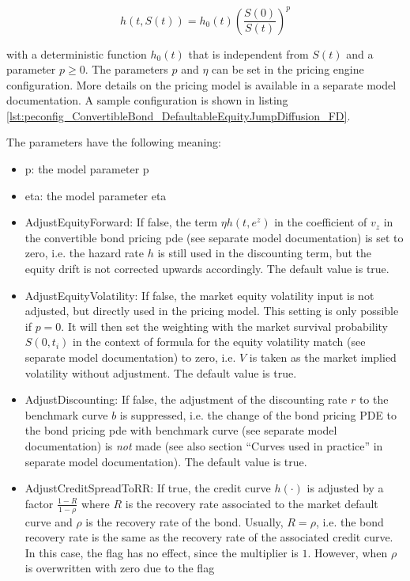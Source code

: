 \begin{equation}
h(t,S(t)) = h_0(t) \left( \frac{S(0)}{S(t)} \right)^p
\end{equation}

with a deterministic function $h_0(t)$ that is independent from $S(t)$ and a parameter $p \geq 0$. The parameters $p$
and $\eta$ can be set in the pricing engine configuration. More details on the pricing model is available in a separate
model documentation. A sample configuration is shown in listing
\ref{lst:peconfig_ConvertibleBond_DefaultableEquityJumpDiffusion_FD}.

The parameters have the following meaning:

\begin{itemize}
\item p: the model parameter p
\item eta: the model parameter eta
\item AdjustEquityForward: If false, the term $\eta h(t,e^z)$ in the coefficient of $v_z$ in the convertible bond
  pricing pde (see separate model documentation) is set to zero, i.e. the hazard rate $h$ is still used in the
  discounting term, but the equity drift is not corrected upwards accordingly. The default value is true.
\item AdjustEquityVolatility: If false, the market equity volatility input is not adjusted, but directly used in the
  pricing model. This setting is only possible if $p=0$. It will then set the weighting with the market survival
  probability $S(0,t_i)$ in the context of formula for the equity volatility match (see separate model documentation) to
  zero, i.e. $V$ is taken as the market implied volatility without adjustment. The default value is true.
\item AdjustDiscounting: If false, the adjustment of the discounting rate $r$ to the benchmark curve $b$ is suppressed,
  i.e. the change of the bond pricing PDE to the bond pricing pde with benchmark curve (see separate model
  documentation) is {\em not} made (see also section ``Curves used in practice'' in separate model documentation). The
  default value is true.
\item AdjustCreditSpreadToRR: If true, the credit curve $h(\cdot)$ is adjusted by a factor $\frac{1-R}{1-\rho}$ where
  $R$ is the recovery rate associated to the market default curve and $\rho$ is the recovery rate of the bond. Usually,
  $R=\rho$, i.e. the bond recovery rate is the same as the recovery rate of the associated credit curve. In this case,
  the flag has no effect, since the multiplier is $1$. However, when $\rho$ is overwritten with zero due to the flag

\end{itemize}
